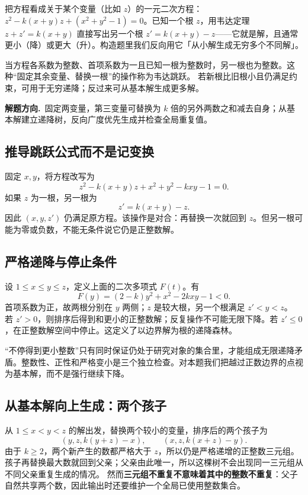 \documentclass[UTF8,a4paper,11pt,twoside,openright,fontset=fandol]{ctexbook}
\theoremstyle{definition}
\newcommand{\hint}{\par\noindent\textbf{解题方向.}\ }
\begin{document}
\begin{tip}[韦达跳跃到底「跳」什么]
把方程看成关于某个变量（比如 $z$）的一元二次方程：$z^2-k(x+y)z+(x^2+y^2-1)=0$。已知一个根 $z$，用韦达定理 $z+z'=k(x+y)$ 直接写出另一个根 $z'=k(x+y)-z$——它就是解，且通常更小（降）或更大（升）。构造题里我们反向用它「从小解生成无穷多个不同解」。
\end{tip}

当方程各系数为整数、首项系数为一且已知一根为整数时，另一根也为整数。这种“固定其余变量、替换一根”的操作称为韦达跳跃。
若新根比旧根小且仍满足约束，可用于无穷递降；反过来可从基本解生成更多解。

\hint 固定两变量，第三变量可替换为 $k$ 倍的另外两数之和减去自身；从基本解建立递降树，反向广度优先生成并检查全局重复值。


\subsection{推导跳跃公式而不是记变换}
固定 $x,y$，将方程改写为
\[
 z^2-k(x+y)z+x^2+y^2-kxy-1=0.
\]
如果 $z$ 为一根，另一根为
\[
 z'=k(x+y)-z.
\]
因此 $(x,y,z')$ 仍满足原方程。该操作是对合：再替换一次就回到 $z$。但另一根可能为零或负数，不能无条件说它仍是正整数解。

\subsection{严格递降与停止条件}
设 $1\le x\le y\le z$，定义上面的二次多项式 $F(t)$。有
\[
 F(y)=(2-k)y^2+x^2-2kxy-1<0.
\]
首项系数为正，故两根分别在 $y$ 两侧；$z$ 是较大根，另一个根满足 $z'<y<z$。
若 $z'>0$，则排序后得到和更小的正整数解；反复操作不可能无限下降。若 $z'\le0$，在正整数解空间中停止。这定义了以边界解为根的递降森林。

\begin{pitfall}
“不停得到更小整数”只有同时保证仍处于研究对象的集合里，才能组成无限递降矛盾。整数性、正性和严格变小是三个独立检查。对本题我们把越过正数边界的点视为基本解，而不是强行继续下降。
\end{pitfall}

\subsection{从基本解向上生成：两个孩子}
从 $1\le x<y<z$ 的解出发，替换两个较小的变量，排序后的两个孩子为
\[
 (y,z,k(y+z)-x),\qquad (x,z,k(x+z)-y).
\]
由于 $k\ge2$，两个新产生的数都严格大于 $z$，所以仍是严格递增的正整数三元组。孩子再替换最大数就回到父亲；父亲由此唯一，所以这棵树不会出现同一三元组从不同父亲重复生成的情况。
然而\textbf{三元组不重复不意味着其中的整数不重复}：父子自然共享两个数，因此输出时还要维护一个全局已使用整数集合。
\end{document}
